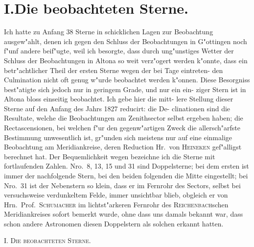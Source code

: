 \documentclass[12pt,a4paper]{article}
\theoremstyle{plain}
\theoremstyle{definition}
\theoremstyle{remark}
\begin{document}
\newpage
\section*{I.\quad Die beobachteten Sterne.}
\setcounter{footnote}{0}

Ich hatte zu Anfang 38 Sterne in schicklichen Lagen zur Beobachtung
ausgew"ahlt, denen ich gegen den Schluss der Beobachtungen in G"ottingen
noch f"unf andere beif"ugte, weil ich besorgte, dass durch ung"unstiges Wetter
der Schluss der Beobachtungen in Altona so weit verz"ogert werden k"onnte,
dass ein betr"achtlicher Theil der ersten Sterne wegen der bei Tage eintreten-
den Culmination nicht oft genug w"urde beobachtet werden k"onnen. Diese
Besorgniss best"atigte sich jedoch nur in geringem Grade, und nur ein ein-
ziger Stern ist in Altona bloss einseitig beobachtet. Ich gebe hier die mitt-
lere Stellung dieser Sterne auf den Anfang des Jahrs 1827 reducirt: die De-
clinationen sind die Resultate, welche die Beobachtungen am Zenithsector
selbst ergeben haben; die Rectascensionen, bei welchen f"ur den gegenw"artigen
Zweck die allersch"arfste Bestimmung unwesentlich ist, gr"unden sich meistens
nur auf eine einmalige Beobachtung am Meridiankreise, deren Reduction
Hr.~von \textsc{Heineken} gef"alligst berechnet hat. Der Bequemlichkeit wegen
bezeichne ich die Sterne mit fortlaufenden Zahlen. Nro.~8, 13, 15 und 31
sind Doppelsterne; bei dem ersten ist immer der nachfolgende Stern, bei den
beiden folgenden die Mitte eingestellt; bei Nro.~31 ist der Nebenstern so
klein, dass er im Fernrohr des Sectors, selbst bei versuchsweise verdunkeltem
Felde, immer unsichtbar blieb, obgleich er von Hrn.~Prof.~\textsc{Schumacher} im
lichtst"arkeren Fernrohr des \textsc{Reichenbach}schen Meridiankreises sofort bemerkt
wurde, ohne dass uns damals bekannt war, dass schon andere Astronomen
diesen Doppelstern als solchen erkannt hatten.

\newpage
\begin{center}
\textsc{I. Die beobachteten Sterne.}
\end{center}
\end{document}
